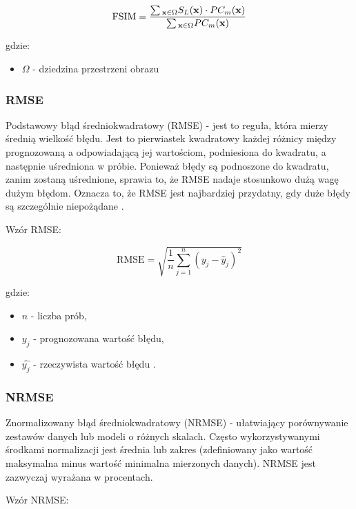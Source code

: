 \documentclass{article}
\begin{document}
\begin{equation}
  \mathrm{FSIM} = {{\sum\limits {_{{\bf x} \in \Omega } {S_{L}}({\bf x}) \cdot PC_{m}({\bf x})} } \over {\sum\limits {_{{\bf x} \in \Omega } PC_{m}({\bf x})}}}
\end{equation}

gdzie:
\begin{itemize}[label=]
  \item $\Omega$ - dziedzina przestrzeni obrazu
\end{itemize}

\subsubsection{RMSE}

Podstawowy błąd średniokwadratowy (RMSE) - jest to reguła, która mierzy średnią wielkość błędu. Jest to pierwiastek kwadratowy każdej różnicy między prognozowaną a odpowiadającą jej wartościom, podniesiona do kwadratu, a następnie uśredniona w próbie. Ponieważ błędy są podnoszone do kwadratu, zanim zostaną uśrednione, sprawia to, że RMSE nadaje stosunkowo dużą wagę dużym błędom. Oznacza to, że RMSE jest najbardziej przydatny, gdy duże błędy są szczególnie niepożądane \cite{rmse}.

Wzór RMSE:

\begin{equation}
    \mathrm{RMSE}=\sqrt{\frac{1}{n}\sum_{j=1}^{n}(y_j - \hat{y}_j)^2}
\end{equation}

gdzie:
\begin{itemize}[label=]
  \item $n$ - liczba prób,
  \item $y_{j}$ - prognozowana wartość błędu,
  \item $\hat{y_{j}}$ - rzeczywista wartość błędu \cite{rmse}.
\end{itemize}

\subsubsection{NRMSE}

Znormalizowany błąd średniokwadratowy (NRMSE) - ułatwiający porównywanie zestawów danych lub modeli o różnych skalach. Często wykorzystywanymi środkami normalizacji jest średnia lub zakres (zdefiniowany jako wartość maksymalna minus wartość minimalna mierzonych danych). NRMSE jest zazwyczaj wyrażana w procentach.

Wzór NRMSE:
\end{document}
